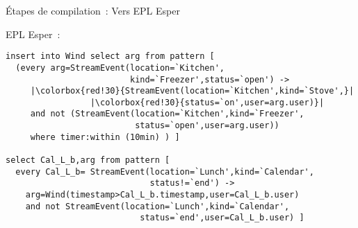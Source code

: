 \begin{frame}[fragile]{Étapes de compilation~: Vers EPL Esper}
\begin{minipage}{.52\linewidth}
\begin{coloredbox}[black]{\tiny EPL Esper~:}
\begin{lstlisting}[language=EPL,basicstyle=\ttfamily\tiny,escapechar=|]
insert into Wind select arg from pattern [ 
  (every arg=StreamEvent(location=`Kitchen',
                         kind=`Freezer',status=`open') ->
     |\colorbox{red!30}{StreamEvent(location=`Kitchen',kind=`Stove',}|
                 |\colorbox{red!30}{status=`on',user=arg.user)}|
     and not (StreamEvent(location=`Kitchen',kind=`Freezer',
                          status=`open',user=arg.user)) 
     where timer:within (10min) ) ]

select Cal_L_b,arg from pattern [ 
  every Cal_L_b= StreamEvent(location=`Lunch',kind=`Calendar',
                             status!=`end') ->
    arg=Wind(timestamp>Cal_L_b.timestamp,user=Cal_L_b.user) 
    and not StreamEvent(location=`Lunch',kind=`Calendar',
                           status=`end',user=Cal_L_b.user) ]
    \end{lstlisting}
\end{coloredbox}
  \end{minipage}
\end{frame}


